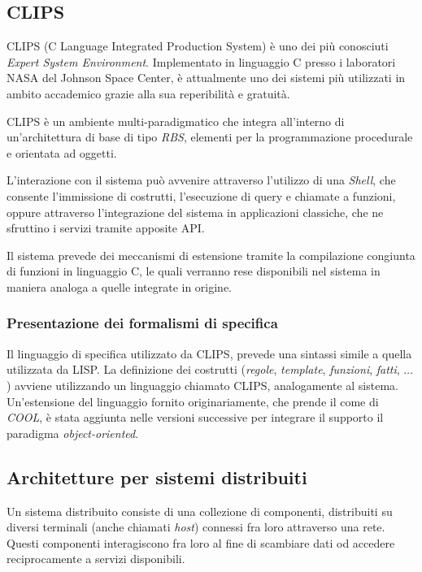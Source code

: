 \subsection{CLIPS}\label{par:clips}

CLIPS (C Language Integrated Production System) è uno dei più conosciuti \emph{Expert System Environment}. Implementato in linguaggio C presso i laboratori NASA del Johnson Space Center, è attualmente uno dei sistemi più utilizzati in ambito accademico grazie alla sua reperibilità e gratuità.

CLIPS è un ambiente multi-paradigmatico che integra all'interno di un'architettura di base di tipo \emph{RBS}, elementi per la programmazione procedurale e orientata ad oggetti.

L'interazione con il sistema può avvenire attraverso l'utilizzo di una \emph{Shell}, che consente l'immissione di costrutti, l'esecuzione di query e chiamate a funzioni, oppure attraverso l'integrazione del sistema in applicazioni classiche, che ne sfruttino i servizi tramite apposite API.

Il sistema prevede dei meccanismi di estensione tramite la compilazione congiunta di funzioni in linguaggio C, le quali verranno rese disponibili nel sistema in maniera analoga a quelle integrate in origine.

\subsubsection{Presentazione dei formalismi di specifica}\label{par:clips-formalism}

Il linguaggio di specifica utilizzato da CLIPS, prevede una sintassi simile a quella utilizzata da LISP. La definizione dei costrutti (\emph{regole}, \emph{template}, \emph{funzioni}, \emph{fatti}, $\dots$) avviene utilizzando un linguaggio chiamato CLIPS, analogamente al sistema. Un'estensione del linguaggio fornito originariamente, che prende il come di \emph{COOL}, è stata aggiunta nelle versioni successive per integrare il supporto il paradigma \emph{object-oriented}.



\subsection{Architetture per sistemi distribuiti}

Un sistema distribuito consiste di una collezione di componenti, distribuiti su diversi terminali (anche chiamati \emph{host}) connessi fra loro attraverso una rete. Questi componenti interagiscono fra loro al fine di scambiare dati od accedere reciprocamente a servizi disponibili.~\cite{Mascolo:2002:MCM:770420.770423}

